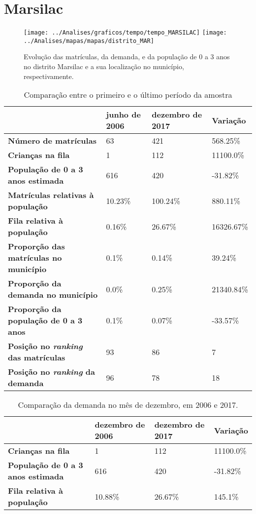\section{Marsilac}
\begin{figure}[H]
	\centering
	\texttt{[image: ../Analises/graficos/tempo/tempo\_MARSILAC]}
	\texttt{[image: ../Analises/mapas/mapas/distrito\_MAR]}
	\caption{Evolução das matrículas, da demanda, e da população de 0 a 3 anos no distrito Marsilac e a sua localização no município, respectivamente.}
\end{figure}
\begin{table}[H]
	\begin{tabular}{|l|l|l|l|}
		\hline
		\textbf{}                                      & \textbf{junho de 2006}       & \textbf{dezembro de 2017}    & \textbf{Variação} \\ \hline
		\textbf{Número de matrículas}                  & 63 & 421 & 568.25\% \\ \hline
		\textbf{Crianças na fila}                      & 1 & 112 & 11100.0\% \\ \hline
		\textbf{População de 0 a 3 anos estimada}      & 616 & 420 & -31.82\% \\ \hline
		\textbf{Matrículas relativas à população}      & 10.23\% & 100.24\% & 880.11\% \\ \hline
		\textbf{Fila relativa à população}             & 0.16\% & 26.67\% & 16326.67\% \\ \hline
		\textbf{Proporção das matrículas no município} & 0.1\% & 0.14\% & 39.24\% \\ \hline
		\textbf{Proporção da demanda no município}     & 0.0\% & 0.25\% & 21340.84\% \\ \hline
		\textbf{Proporção da população de 0 a 3 anos}  & 0.1\% & 0.07\% & -33.57\% \\ \hline
		\textbf{Posição no \textit{ranking} das matrículas}     & 93 & 86 & 7 \\ \hline
		\textbf{Posição no \textit{ranking} da demanda}         & 96 & 78 & 18 \\ \hline
	\end{tabular}
	\caption{Comparação entre o primeiro e o último período da amostra}
\end{table}
\begin{table}[H]
	\begin{tabular}{|l|l|l|l|}
		\hline
		\textbf{}                                 & \textbf{dezembro de 2006} & \textbf{dezembro de 2017} & \textbf{Variação} \\ \hline
		\textbf{Crianças na fila}                      & 1 & 112 & 11100.0\% \\ \hline
		\textbf{População de 0 a 3 anos estimada}      & 616 & 420 & -31.82\% \\ \hline
		\textbf{Fila relativa à população}             & 10.88\% & 26.67\% & 145.1\% \\ \hline
	\end{tabular}
	\caption{Comparação da demanda no mês de dezembro, em 2006 e 2017.}
\end{table}
